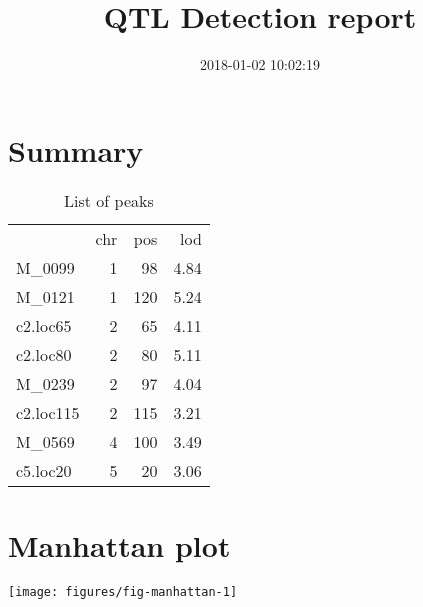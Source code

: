 \documentclass[a4paper,11pt]{article}\usepackage[]{graphicx}\usepackage[]{color}
\title{QTL Detection report}%
\author{\vspace{-5ex}}
\date{2018-01-02 10:02:19}
\makeatletter
\def\maxwidth{ %
  \ifdim\Gin@nat@width>\linewidth
    \linewidth
  \else
    \Gin@nat@width
  \fi
}
\newenvironment{knitrout}{}{} %
\makeatother
\begin{document}


\maketitle
\singlespacing

\section{Summary}

\begin{table}[ht]
\begin{flushleft}
\caption{List of peaks} 
\label{summary}
\begin{tabular}{lrrr}
  & chr & pos & lod \\ 
 M\_0099 & 1 & 98 & 4.84 \\ 
  M\_0121 & 1 & 120 & 5.24 \\ 
  c2.loc65 & 2 & 65 & 4.11 \\ 
  c2.loc80 & 2 & 80 & 5.11 \\ 
  M\_0239 & 2 & 97 & 4.04 \\ 
  c2.loc115 & 2 & 115 & 3.21 \\ 
  M\_0569 & 4 & 100 & 3.49 \\ 
  c5.loc20 & 5 & 20 & 3.06 \\ 
  \end{tabular}
\end{flushleft}
\end{table}

\newpage
\section{Manhattan plot}
\begin{knitrout}
\color{fgcolor}

\texttt{[image: figures/fig-manhattan-1]} \hfill{}



\end{knitrout}

\end{document}

